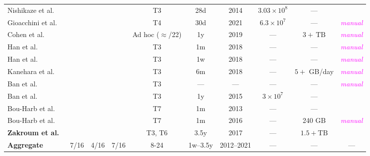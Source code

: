 \documentclass[manuscript,nonacm]{acmart}
\newcommand{\cmark}{\ding{51}}%
\newcommand{\xmark}{\ding{55}}%
\newcommand{\wc}[1]{\textit{\textcolor{magenta}{#1}}} %
\begin{document}
\begin{table*}[h!]
\begin{tabular}{@{}lccccccccc@{}}
        Nishikaze et al.~\cite{2015nishikaze}
        & \xmark
        & \xmark & \xmark
        & T3
        & 28d & 2014
        & $3.03\times10^{8}$ & ---
        & \xmark \\

        Gioacchini et al.~\cite{2021gioacchini,2023gioacchini}
        & \cmark~\cite{2020cohen}
        & \cmark & \cmark
        & T4
        & 30d & 2021
        & $6.3\times10^{7}$ & ---
        & \wc{manual} \\

        Cohen et al.~\cite{2020cohen}
        & \cmark~\cite{2016ban}
        & \xmark & \cmark
        & Ad hoc ($\approx$/22)
        & 1y & 2019
        & --- & $3+\,\mathrm{TB}$
        & \wc{manual} \\

        Han et al.~\cite{2021han,2022han}
        & \cmark
        & \cmark & \xmark
        & T3
        & 1m & 2018
        & --- & ---
        & \wc{manual} \\

        Han et al.~\cite{2020han,2022han}
        & \cmark
        & \cmark & \cmark
        & T3
        & 1w & 2018
        & --- & ---
        & \wc{manual} \\

        Kanehara et al.~\cite{2019kanehara,2022han}
        & \cmark
        & \xmark & \cmark
        & T3
        & 6m & 2018
        & --- & $5+$ GB/day
        & \wc{manual} \\

        Ban et al.~\cite{2017ban}
        & \xmark
        & \xmark & \xmark
        & T3
        & --- & ---
        & --- & ---
        & \wc{manual} \\

        Ban et al.~\cite{2016ban}
        & \xmark
        & \xmark & \xmark
        & T3
        & 1y & 2015
        & $3\times10^{7}$ & ---
        & \xmark \\

        Bou-Harb et al.~\cite{2014bouharb}
        & \xmark
        & \xmark & \xmark
        & T7
        & 1m & 2013
        & --- & ---
        & \xmark \\

        Bou-Harb et al.~\cite{2019bouharb,2015bouharb}
        & \cmark
        & \xmark & \cmark
        & T7
        & 1m & 2016
        & --- & 240 GB
        & \wc{manual} \\

        \textbf{Zakroum et al.~\cite{2022zakroum,2018zakroum}}
        & \cmark
        & \xmark & \cmark
        & T3, T6
        & 3.5y & 2017
        & --- & $1.5+\mathrm{TB}$
        & \xmark \\
        \midrule
        \textbf{Aggregate}
        & 7/16
        & 4/16 & 7/16
        & 8-24
        & 1w--3.5y & 2012--2021
        & --- & ---
        & --- \\
        \bottomrule
    \end{tabular}
\end{table*}
\end{document}
